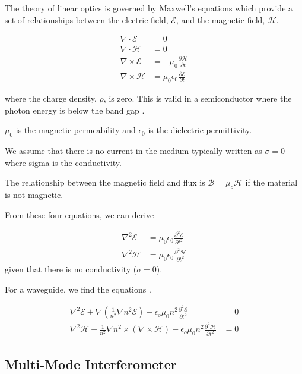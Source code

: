 The theory of linear optics is governed by Maxwell's equations which provide a set of relationships between the electric field, $\mathcal{E}$, and the magnetic field, $\mathcal{H}$.

\begin{align}
	\nabla\cdot\mathcal{E} &= 0\\
	\nabla\cdot\mathcal{H} &= 0\\
	\nabla\times\mathcal{E} &= -\mu_0\frac{\partial\mathcal{H}}{\partial t}\\
	\nabla\times\mathcal{H} &= \mu_0\epsilon_0\frac{\partial\mathcal{E}}{\partial t}
\end{align}

where the charge density, $\rho$, is zero. This is valid in a semiconductor where the photon energy is below the band gap \cite{SilverstoneThesis}.

$\mu_0$ is the magnetic permeability and $\epsilon_0$ is the dielectric permittivity.

We assume that there is no current in the medium typically written as $\sigma = 0$ where sigma is the conductivity.

The relationship between the magnetic field and flux is $\mathcal{B} = \mu_o \mathcal{H}$ if the material is not magnetic.

From these four equations, we can derive

\begin{align}
	\nabla^2\mathcal{E} &= \mu_0\epsilon_0\frac{\partial^2\mathcal{E}}{\partial t^2}\\ 
	\nabla^2\mathcal{H} &= \mu_0\epsilon_0\frac{\partial^2\mathcal{H}}{\partial t^2}
\end{align}
given that there is no conductivity ($\sigma=0$).

For a waveguide, we find the equations \cite{lifante2003integrated}.

\begin{align}
	\nabla^2\mathcal{E} + \nabla\left(\frac{1}{n^2}\nabla n^2\mathcal{E}\right) - \epsilon_o\mu_0 n^2 \frac{\partial^2\mathcal{E}}{\partial t^2} &= 0\\
	\nabla^2\mathcal{H} + \frac{1}{n^2}\nabla n^2\times\left(\nabla\times\mathcal{H}\right) - \epsilon_o\mu_0 n^2 \frac{\partial^2\mathcal{H}}{\partial t^2} &= 0
\end{align}

\subsection{Multi-Mode Interferometer}

